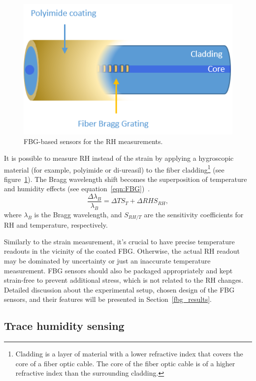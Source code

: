\begin{figure}[!h]
\centering
\includegraphics[width=0.45\columnwidth]{Chapter5/images/Picture1.png}
\caption{FBG-based sensors for the RH measurements.}
\label{fig:fbg_scheme}
\end{figure}


It is possible to measure RH instead of the strain by applying a hygroscopic material (for example, polyimide or di-ureasil) to the fiber cladding\footnote{Cladding is a layer of material with a lower refractive index that covers the core of a fiber optic cable. The core of the fiber optic cable is of a higher refractive index than the surrounding cladding.} (see figure~\ref{fig:fbg_scheme}). The Bragg wavelength shift becomes the superposition of temperature and humidity effects (see equation~\ref{eqn:FBG})~\cite{Kronenberg:02, YEO_PI}. 
                             \begin{equation}\label{eqn:FBG}
                                    \frac{\Delta\lambda_{B}}{\lambda_{B}}=\Delta TS_{T}+\Delta RHS_{RH},
                            \end{equation}
                            where $\lambda_{B}$ is the Bragg wavelength, and $S_{RH/T}$ are the sensitivity coefficients for RH and temperature, respectively. 

Similarly to the strain measurement, it’s crucial to have precise temperature readouts in the vicinity of the coated \gls{FBG}. Otherwise, the actual RH readout may be dominated by uncertainty or just an inaccurate temperature measurement. \gls{FBG} sensors should also be packaged appropriately and kept strain-free to prevent additional stress, which is not related to the RH changes. Detailed discussion about the experimental setup, chosen design of the \gls{FBG} sensors, and their features will be presented in Section~\ref{fbg_results}.



\subsection{Trace humidity sensing}


